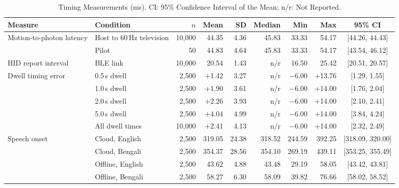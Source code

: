 \documentclass[journal]{IEEEtran}
\begin{document}
\begin{table}[!t]
\caption{Timing Measurements (ms). CI: 95\% Confidence Interval of the Mean; n/r: Not Reported.}
\label{tab:timing}
\centering
\footnotesize
\begin{tabular}{@{}llrrrrrrc@{}}
\toprule
Measure & Condition & $n$ & Mean & SD & Median & Min & Max & 95\% CI \\
\midrule
Motion-to-photon latency & Host to 60\,Hz television & 10,000 & 44.35 & 4.36 & 45.83 & 33.33 & 54.17 & [44.26, 44.43] \\
 & Pilot & 50 & 44.83 & 4.64 & 45.83 & 33.33 & 54.17 & [43.54, 46.12] \\
HID report interval & BLE link & 10,000 & 20.54 & 1.43 & n/r & 16.50 & 25.42 & [20.51, 20.57] \\
\addlinespace
Dwell timing error & 0.5\,s dwell & 2,500 & $+$1.42 & 3.27 & n/r & $-$6.00 & $+$13.76 & [1.29, 1.55] \\
 & 1.0\,s dwell & 2,500 & $+$1.90 & 3.61 & n/r & $-$6.00 & $+$14.00 & [1.76, 2.04] \\
 & 2.0\,s dwell & 2,500 & $+$2.26 & 3.93 & n/r & $-$6.00 & $+$14.00 & [2.10, 2.41] \\
 & 5.0\,s dwell & 2,500 & $+$4.04 & 4.99 & n/r & $-$6.00 & $+$14.00 & [3.84, 4.24] \\
 & All dwell times & 10,000 & $+$2.41 & 4.13 & n/r & $-$6.00 & $+$14.00 & [2.32, 2.49] \\
\addlinespace
Speech onset & Cloud, English & 2,500 & 319.05 & 24.38 & 318.52 & 244.59 & 392.25 & [318.09, 320.00] \\
 & Cloud, Bengali & 2,500 & 354.37 & 28.56 & 354.10 & 269.19 & 439.11 & [353.25, 355.49] \\
 & Offline, English & 2,500 & 43.62 & 4.88 & 43.48 & 29.19 & 58.05 & [43.42, 43.81] \\
 & Offline, Bengali & 2,500 & 58.27 & 6.30 & 58.09 & 39.82 & 76.66 & [58.02, 58.52] \\
\bottomrule
\end{tabular}
\end{table}
\end{document}
